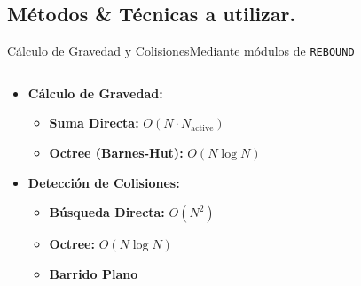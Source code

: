 \subsection[Métodos \& Técnicas]{Métodos \& Técnicas a utilizar.}

\begin{frame}{Cálculo de Gravedad y Colisiones}{Mediante módulos de \texttt{REBOUND}}
    \begin{columns}
        \begin{column}{0.6\textwidth}
            \small
            \begin{itemize}
                \item \textbf{Cálculo de Gravedad:}
                \begin{itemize}
                    \item \textbf{Suma Directa:} $O(N \cdot N_{\text{active}})$
                    \item \textbf{Octree (Barnes-Hut):} $O(N \log N)$
                \end{itemize}
                \item \textbf{Detección de Colisiones:}
                \begin{itemize}
                    \item \textbf{Búsqueda Directa:} $O(N^2)$
                    \item \textbf{Octree:} $O(N \log N)$
                    \item \textbf{Barrido Plano}
                \end{itemize}
            \end{itemize}
        \end{column}
        \begin{column}{0.4\textwidth}
            \centering
            \begin{figure}[H]
                \centering
\end{figure}
\end{column}
\end{columns}
\end{frame}
